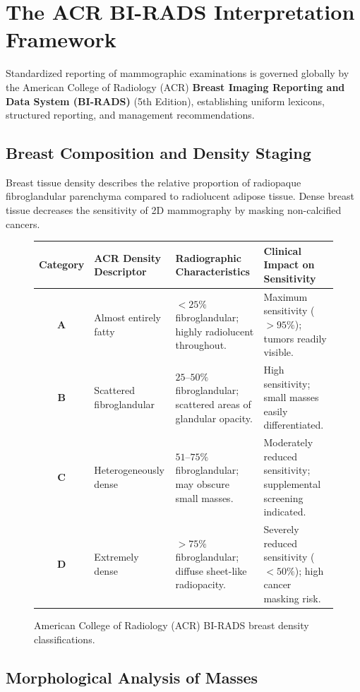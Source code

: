\documentclass[11pt,a4paper]{article}
\begin{document}
\section{The ACR BI-RADS Interpretation Framework}

Standardized reporting of mammographic examinations is governed globally by the American College of Radiology (ACR) \textbf{Breast Imaging Reporting and Data System (BI-RADS)} (5th Edition), establishing uniform lexicons, structured reporting, and management recommendations.

\subsection{Breast Composition and Density Staging}

Breast tissue density describes the relative proportion of radiopaque fibroglandular parenchyma compared to radiolucent adipose tissue. Dense breast tissue decreases the sensitivity of 2D mammography by masking non-calcified cancers.

\begin{figure}[htbp]
\centering
\setlength{\tabcolsep}{4pt}
\begin{tabular}{clp{6.0cm}p{4.5cm}}
\toprule
\textbf{Category} & \textbf{ACR Density Descriptor} & \textbf{Radiographic Characteristics} & \textbf{Clinical Impact on Sensitivity} \\
\midrule
\textbf{A} & Almost entirely fatty & $< 25\%$ fibroglandular; highly radiolucent throughout. & Maximum sensitivity ($> 95\%$); tumors readily visible. \\
\addlinespace
\textbf{B} & Scattered fibroglandular & $25\text{--}50\%$ fibroglandular; scattered areas of glandular opacity. & High sensitivity; small masses easily differentiated. \\
\addlinespace
\textbf{C} & Heterogeneously dense & $51\text{--}75\%$ fibroglandular; may obscure small masses. & Moderately reduced sensitivity; supplemental screening indicated. \\
\addlinespace
\textbf{D} & Extremely dense & $> 75\%$ fibroglandular; diffuse sheet-like radiopacity. & Severely reduced sensitivity ($< 50\%$); high cancer masking risk. \\
\bottomrule
\end{tabular}
\caption{American College of Radiology (ACR) BI-RADS breast density classifications.}
\label{tab:birads_density}
\end{figure}

\subsection{Morphological Analysis of Masses}
\end{document}
